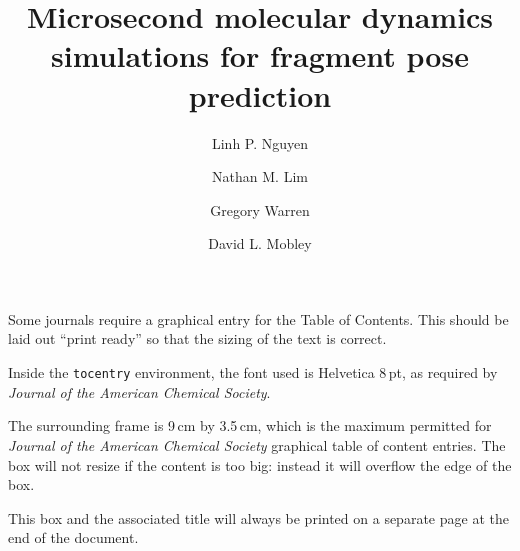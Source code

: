 \documentclass[journal=jcisd8,manuscript=article]{achemso}
\author{Linh P. Nguyen}
\author{Nathan M. Lim}
\author{Gregory Warren}
\author{David L. Mobley}
\affiliation[University of California---Irvine]
{Department of Pharmaceutical Sciences, University of California---Irvine, Irvine, California 92697, United States}
\title{Microsecond molecular dynamics simulations for fragment pose prediction}
\begin{document}
\begin{tocentry}
Some journals require a graphical entry for the Table of Contents.
This should be laid out ``print ready'' so that the sizing of the
text is correct.

Inside the \texttt{tocentry} environment, the font used is Helvetica
8\,pt, as required by \emph{Journal of the American Chemical
Society}.

The surrounding frame is 9\,cm by 3.5\,cm, which is the maximum
permitted for  \emph{Journal of the American Chemical Society}
graphical table of content entries. The box will not resize if the
content is too big: instead it will overflow the edge of the box.

This box and the associated title will always be printed on a
separate page at the end of the document.
\end{tocentry}
\end{document}
